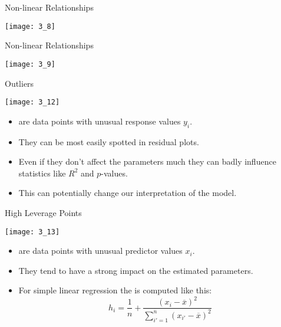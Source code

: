 \documentclass[mathserif, aspectratio=169]{beamer}
\begin{document}
\begin{frame}{Non-linear Relationships}
	\vspace{-10mm}
	\begin{center}
		\texttt{[image: 3\_8]}
	\end{center}
	\vspace{-10mm}
\end{frame}

\begin{frame}{Non-linear Relationships}
	\begin{center}
		\texttt{[image: 3\_9]}
	\end{center}
\end{frame}

\begin{frame}{Outliers}
	\vspace{-8mm}
	\begin{center}
		\texttt{[image: 3\_12]}
	\end{center}
	\vspace{-8mm}
	\begin{itemize}
		\item {} are data points with unusual response values $y_i$.
		\item They can be most easily spotted in residual plots.
		\item Even if they don't affect the parameters much they can badly influence\\
			statistics like $R^2$ and $p$-values.
		\item This can potentially change our interpretation of the model.
	\end{itemize}
\end{frame}

\begin{frame}{High Leverage Points}
	\vspace{-8mm}
	\begin{center}
		\texttt{[image: 3\_13]}
	\end{center}
	\vspace{-8mm}
	\begin{itemize}
		\item {} are data points with unusual predictor values $x_i$.
		\item They tend to have a strong impact on the estimated parameters.
		\item For simple linear regression the  is computed like this:
			\[
				h_i = \frac{1}{n} + \frac{(x_i - \overline{x})^2}{\sum^n_{i' = 1} (x_{i'} - \overline{x})^2}
			\]
	\end{itemize}
\end{frame}
\end{document}
